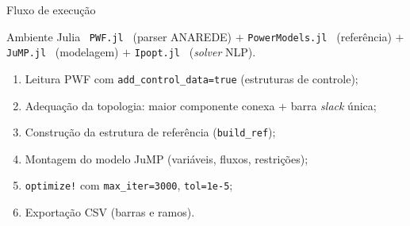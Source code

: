 \documentclass{libs/ufc_format}
\begin{document}
\begin{frame}{Fluxo de execução}
    \begin{exampleblock}{Ambiente Julia~\cite{bezanson2017julia}}
        \texttt{PWF.jl}~\cite{pwfjl} (parser ANAREDE) $+$ \texttt{PowerModels.jl}~\cite{coffrin2018powermodels} (referência) $+$ \texttt{JuMP.jl}~\cite{lubin2023jump} (modelagem) $+$ \texttt{Ipopt.jl}~\cite{wachterBiegler2006ipopt} (\textit{solver} NLP).
    \end{exampleblock}

    \vspace{0.1cm}
    \begin{enumerate}
        \item Leitura PWF com \texttt{add\_control\_data=true} (estruturas de controle);
        \item Adequação da topologia: maior componente conexa + barra \textit{slack} única;
        \item Construção da estrutura de referência (\texttt{build\_ref});
        \item Montagem do modelo JuMP (variáveis, fluxos, restrições);
        \item \texttt{optimize!} com \texttt{max\_iter=3000}, \texttt{tol=1e-5};
        \item Exportação CSV (barras e ramos).
    \end{enumerate}

    \vspace{0.15cm}
\end{frame}
\end{document}
